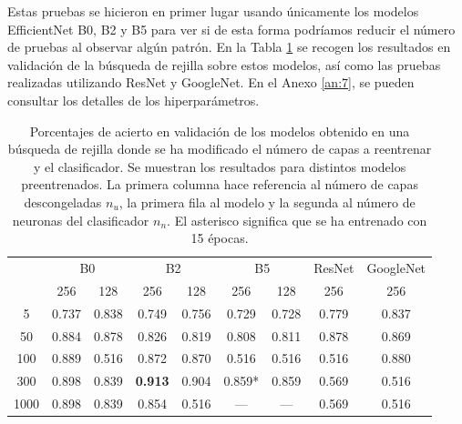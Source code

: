 \documentclass[a4paper,12pt,oneside,titlepage]{book}
\begin{document}
Estas pruebas se hicieron en primer lugar usando únicamente los modelos EfficientNet B0, B2 y B5 para ver si de esta forma podríamos reducir el número de pruebas al observar algún patrón. En la Tabla \ref{tab:res_ajuste_pre} se recogen los resultados en validación de la búsqueda de rejilla sobre estos modelos, así como las pruebas realizadas utilizando ResNet y GoogleNet. En el Anexo \ref{an:7}, se pueden consultar los detalles de los hiperparámetros.

\begin{table}[h!]
  \centering
  \begin{tabular}{|c||cc|cc|cc|c|c|}
  \hline
  \multirow{2}{*}{} & \multicolumn{2}{c|}{B0}            & \multicolumn{2}{c|}{B2}            & \multicolumn{2}{c|}{B5}             & ResNet & GoogleNet \\ \cline{2-9} 
                    & \multicolumn{1}{c|}{256}   & 128   & \multicolumn{1}{c|}{256}   & 128   & \multicolumn{1}{c|}{256}    & 128   & 256    & 256       \\ \hline\hline
  5                 & \multicolumn{1}{c|}{0.737} & 0.838 & \multicolumn{1}{c|}{0.749} & 0.756 & \multicolumn{1}{c|}{0.729}  & 0.728 & 0.779  & 0.837     \\ \hline
  50                & \multicolumn{1}{c|}{0.884} & 0.878 & \multicolumn{1}{c|}{0.826} & 0.819 & \multicolumn{1}{c|}{0.808}  & 0.811 & 0.878  & 0.869     \\ \hline
  100               & \multicolumn{1}{c|}{0.889} & 0.516 & \multicolumn{1}{c|}{0.872} & 0.870 & \multicolumn{1}{c|}{0.516}  & 0.516 & 0.516  & 0.880     \\ \hline
  300               & \multicolumn{1}{c|}{0.898} & 0.839 & \multicolumn{1}{c|}{\textbf{0.913}} & 0.904 & \multicolumn{1}{c|}{0.859*} & 0.859 & 0.569  & 0.516     \\ \hline
  1000              & \multicolumn{1}{c|}{0.898} & 0.839 & \multicolumn{1}{c|}{0.854} & 0.516 & \multicolumn{1}{c|}{---}    & ---   & 0.569  & 0.516     \\ \hline
  \end{tabular}
  \caption{Porcentajes de acierto en validación de los modelos obtenido en una búsqueda de rejilla donde se ha modificado el número de capas a reentrenar y el clasificador. Se muestran los resultados para distintos modelos preentrenados. La primera columna hace referencia al número de capas descongeladas $n_u$, la primera fila al modelo y la segunda al número de neuronas del clasificador $n_n$. El asterisco significa que se ha entrenado con 15 épocas.}
  \label{tab:res_ajuste_pre}
\end{table}
\end{document}
